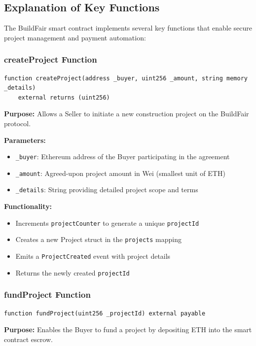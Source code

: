 \documentclass[12pt]{article}
\begin{document}
\subsection{Explanation of Key Functions}
The BuildFair smart contract implements several key functions that enable secure project management and payment automation:

\subsubsection{createProject Function}
\begin{lstlisting}[language=Solidity]
function createProject(address _buyer, uint256 _amount, string memory _details) 
    external returns (uint256)
\end{lstlisting}

\textbf{Purpose:} Allows a Seller to initiate a new construction project on the BuildFair protocol.

\textbf{Parameters:}
\begin{itemize}
    \item \texttt{\_buyer}: Ethereum address of the Buyer participating in the agreement
    \item \texttt{\_amount}: Agreed-upon project amount in Wei (smallest unit of ETH)
    \item \texttt{\_details}: String providing detailed project scope and terms
\end{itemize}

\textbf{Functionality:}
\begin{itemize}
    \item Increments \texttt{projectCounter} to generate a unique \texttt{projectId}
    \item Creates a new Project struct in the \texttt{projects} mapping
    \item Emits a \texttt{ProjectCreated} event with project details
    \item Returns the newly created \texttt{projectId}
\end{itemize}

\subsubsection{fundProject Function}
\begin{lstlisting}[language=Solidity]
function fundProject(uint256 _projectId) external payable
\end{lstlisting}

\textbf{Purpose:} Enables the Buyer to fund a project by depositing ETH into the smart contract escrow.
\end{document}
